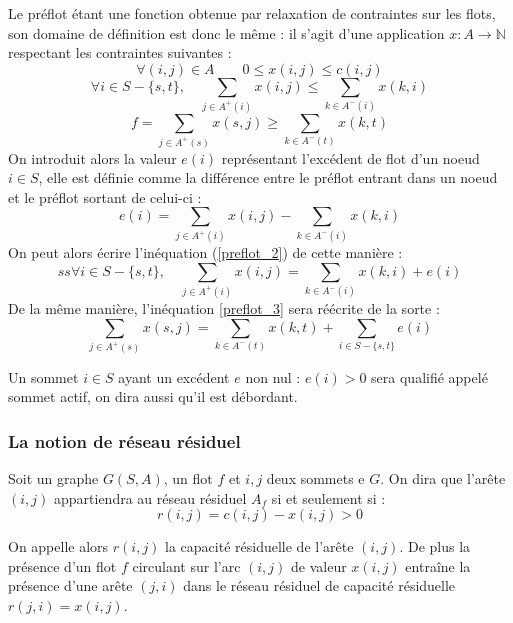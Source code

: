 Le préflot étant une fonction obtenue par relaxation de contraintes sur les flots, son
domaine de définition est donc le même : il s'agit d'une application $x : A \rightarrow \mathbb{N}$
respectant les contraintes suivantes :
		\begin{equation}
			\label{preflot_1}
			\forall (i,j) \in A \qquad 0 \leq x(i,j) \leq c(i,j)
		\end{equation}
		\begin{equation} 
			\label{preflot_2}
			\forall i \in S - \{s,t\},\quad \sum_{j \in A^+(i)} x(i,j) \leq \sum_{k \in A^-(i)} x(k,i)
		\end{equation}
		\begin{equation}
			\label{preflot_3}
			f = \sum_{j \in A^+(s)} x(s,j) \geq \sum_{k \in A^-(t)} x(k, t)
		\end{equation}
On introduit alors la valeur $e(i)$ représentant l'excédent de flot d'un noeud $i \in S$, elle est
définie comme la différence entre le préflot entrant dans un noeud et le préflot sortant de celui-ci
: \begin{equation}
	e(i) = \sum_{j \in A^+(i)} x(i,j) - \sum_{k \in A^-(i)} x(k,i)
\end{equation}
 On peut alors écrire l'inéquation (\ref{preflot_2}) de cette manière :
\begin{equation}ss
\forall i \in S - \{s,t\},\quad \sum_{j \in A^+(i)} x(i,j) = \sum_{k \in A^-(i)} x(k,i) + e(i)
\end{equation}
De la même manière, l'inéquation \ref{preflot_3} sera réécrite de la sorte :
\begin{equation}
\sum_{j \in A^+(s)} x(s,j) = \sum_{k \in A^-(t)} x(k, t) + \sum_{i \in S-\{s,t\}} e(i)
\end{equation}

Un sommet $i \in S$ ayant un excédent $e$ non nul : $e(i) > 0$ sera qualifié appelé sommet actif, on
dira aussi qu'il est débordant.

\subsubsection{La notion de réseau résiduel}

Soit un graphe $G(S, A)$, un flot $f$ et $i,j$ deux sommets e $G$. On dira que l'arête
$(i,j)$ appartiendra au réseau résiduel $A_f$ si et seulement si :
\begin{equation}
	 r(i,j) = c(i,j) - x(i,j) > 0
\end{equation}

On appelle alors $r(i,j)$ la capacité résiduelle de l'arête $(i,j)$. De plus la présence d'un flot
$f$ circulant sur l'arc $(i,j)$ de valeur $x(i,j)$ entraîne la présence d'une arête $(j,i)$
dans le réseau résiduel de capacité résiduelle $r(j,i) = x(i,j)$. 

